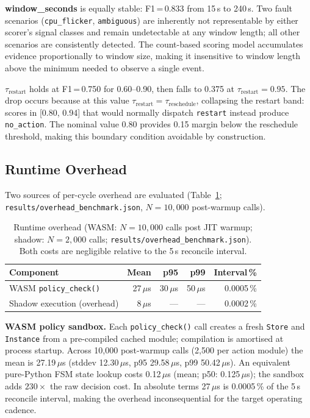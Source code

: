 \documentclass[conference]{IEEEtran}
\begin{document}
\textbf{window\_seconds} is equally stable: F1\,=\,0.833 from 15\,s to 240\,s. Two fault scenarios (\texttt{cpu\_flicker}, \texttt{ambiguous}) are inherently not representable by either scorer's signal classes and remain undetectable at any window length; all other scenarios are consistently detected. The count-based scoring model accumulates evidence proportionally to window size, making it insensitive to window length above the minimum needed to observe a single event.

\textbf{$\tau_{\mathrm{restart}}$} holds at F1\,=\,0.750 for 0.60--0.90, then falls to 0.375 at $\tau_{\mathrm{restart}} = 0.95$. The drop occurs because at this value $\tau_{\mathrm{restart}} = \tau_{\mathrm{reschedule}}$, collapsing the restart band: scores in [0.80, 0.94] that would normally dispatch \texttt{restart} instead produce \texttt{no\_action}. The nominal value 0.80 provides 0.15 margin below the reschedule threshold, making this boundary condition avoidable by construction.

\subsection{Runtime Overhead}
\label{sec:overhead}

Two sources of per-cycle overhead are evaluated (Table~\ref{tab:overhead}; \texttt{results/overhead\_benchmark.json}, $N = 10{,}000$ post-warmup calls).

\begin{table}[t]
\caption{Runtime overhead (WASM: $N = 10{,}000$ calls post JIT warmup; shadow: $N = 2{,}000$ calls; \texttt{results/overhead\_benchmark.json}). Both costs are negligible relative to the 5\,s reconcile interval.}
\label{tab:overhead}
\centering
\renewcommand{\arraystretch}{1.15}
\begin{tabular}{lrrrr}
\hline
Component & Mean & p95 & p99 & Interval\,\% \\
\hline
WASM \texttt{policy\_check()} & 27\,$\mu$s & 30\,$\mu$s & 50\,$\mu$s & 0.0005\,\% \\
Shadow execution (overhead) & 8\,$\mu$s & --- & --- & 0.0002\,\% \\
\hline
\end{tabular}
\end{table}

\textbf{WASM policy sandbox.} Each \texttt{policy\_check()} call creates a fresh \texttt{Store} and \texttt{Instance} from a pre-compiled cached module; compilation is amortised at process startup. Across 10{,}000 post-warmup calls (2{,}500 per action module) the mean is 27.19\,$\mu$s (stddev 12.30\,$\mu$s, p95 29.58\,$\mu$s, p99 50.42\,$\mu$s). An equivalent pure-Python FSM state lookup costs 0.12\,$\mu$s (mean; p50: 0.125\,$\mu$s); the sandbox adds $230{\times}$ the raw decision cost. In absolute terms 27\,$\mu$s is 0.0005\,\% of the 5\,s reconcile interval, making the overhead inconsequential for the target operating cadence.
\end{document}
